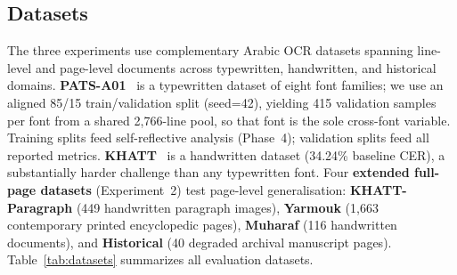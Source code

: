 \documentclass[conference]{IEEEtran}
\begin{document}
\subsection{Datasets}
The three experiments use complementary Arabic OCR datasets spanning
line-level and page-level documents across typewritten, handwritten,
and historical domains. \textbf{PATS-A01}~\cite{pats} is a typewritten dataset
of eight font families; we use an aligned 85/15 train/validation split
(seed=42), yielding 415 validation samples per font from a shared 2{,}766-line
pool, so that font is the sole cross-font variable. Training splits feed
self-reflective analysis (Phase~4); validation splits feed all reported metrics.
\textbf{KHATT}~\cite{khatt} is a handwritten dataset (34.24\% baseline CER),
a substantially harder challenge than any typewritten font. Four
\textbf{extended full-page datasets} (Experiment~2) test page-level
generalisation: \textbf{KHATT-Paragraph} (449 handwritten paragraph images),
\textbf{Yarmouk} (1{,}663 contemporary printed encyclopedic pages),
\textbf{Muharaf} (116 handwritten documents), and \textbf{Historical} (40
degraded archival manuscript pages). Table~\ref{tab:datasets} summarizes all
evaluation datasets.
\end{document}
